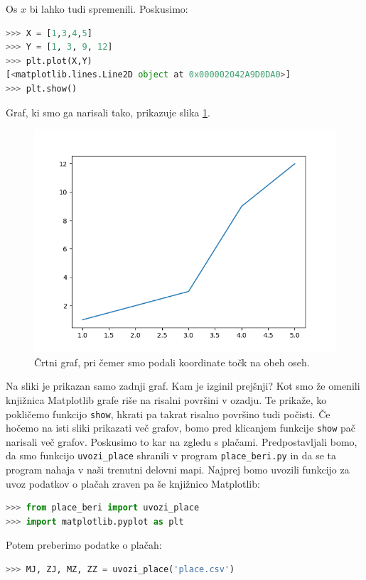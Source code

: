 Os $x$ bi lahko tudi spremenili. Poskusimo:
\begin{lstlisting}[language=Python, showstringspaces=false]
>>> X = [1,3,4,5]
>>> Y = [1, 3, 9, 12]
>>> plt.plot(X,Y)
[<matplotlib.lines.Line2D object at 0x000002042A9D0DA0>]
>>> plt.show()
\end{lstlisting}
Graf, ki smo ga narisali tako, prikazuje slika \ref{img:plt2}.
\begin{figure}
    \includegraphics[width=\linewidth]{img/plt2.png}
    \caption{Črtni graf, pri čemer smo podali koordinate točk na obeh oseh.}
    \label{img:plt2}
\end{figure}
Na sliki je prikazan samo zadnji graf. Kam je izginil prejšnji? Kot smo že omenili knjižnica Matplotlib grafe riše na risalni površini v ozadju. Te prikaže, ko pokličemo funkcijo \texttt{show}, hkrati pa takrat risalno površino tudi počisti. Če hočemo na isti sliki prikazati več grafov, bomo pred klicanjem funkcije \texttt{show} pač narisali več grafov. Poskusimo to kar na zgledu s plačami. Predpostavljali bomo, da smo funkcijo \texttt{uvozi\_place} shranili v program \texttt{place\_beri.py} in da se ta program nahaja v naši trenutni delovni mapi. Najprej bomo uvozili funkcijo za uvoz podatkov o plačah zraven pa še knjižnico Matplotlib:
\begin{lstlisting}[language=Python, showstringspaces=false]
>>> from place_beri import uvozi_place
>>> import matplotlib.pyplot as plt
\end{lstlisting}
Potem preberimo podatke o plačah:
\begin{lstlisting}[language=Python, showstringspaces=false]
>>> MJ, ZJ, MZ, ZZ = uvozi_place('place.csv')
\end{lstlisting}
